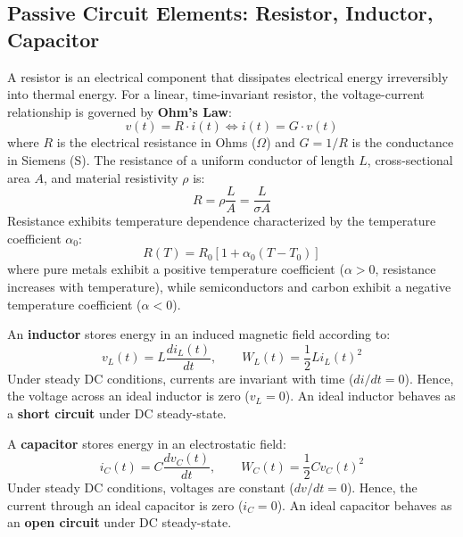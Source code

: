 \subsection{Passive Circuit Elements: Resistor, Inductor, Capacitor}

\begin{definition}
A resistor is an electrical component that dissipates electrical energy irreversibly into thermal energy. For a linear, time-invariant resistor, the voltage-current relationship is governed by \textbf{Ohm's Law}:
\begin{equation}
v(t) = R \cdot i(t) \iff i(t) = G \cdot v(t)
\end{equation}
where $R$ is the electrical resistance in Ohms ($\Omega$) and $G = 1/R$ is the conductance in Siemens (S). The resistance of a uniform conductor of length $L$, cross-sectional area $A$, and material resistivity $\rho$ is:
\begin{equation}
R = \rho \frac{L}{A} = \frac{L}{\sigma A}
\end{equation}
Resistance exhibits temperature dependence characterized by the temperature coefficient $\alpha_0$:
\begin{equation}
R(T) = R_0 \left[ 1 + \alpha_0 (T - T_0) \right]
\end{equation}
where pure metals exhibit a positive temperature coefficient ($\alpha > 0$, resistance increases with temperature), while semiconductors and carbon exhibit a negative temperature coefficient ($\alpha < 0$).
\end{definition}

\begin{definition}
An \textbf{inductor} stores energy in an induced magnetic field according to:
\begin{equation}
v_L(t) = L \frac{di_L(t)}{dt}, \qquad W_L(t) = \frac{1}{2} L i_L(t)^2
\end{equation}
Under steady DC conditions, currents are invariant with time ($di/dt = 0$). Hence, the voltage across an ideal inductor is zero ($v_L = 0$). An ideal inductor behaves as a \textbf{short circuit} under DC steady-state.

A \textbf{capacitor} stores energy in an electrostatic field:
\begin{equation}
i_C(t) = C \frac{dv_C(t)}{dt}, \qquad W_C(t) = \frac{1}{2} C v_C(t)^2
\end{equation}
Under steady DC conditions, voltages are constant ($dv/dt = 0$). Hence, the current through an ideal capacitor is zero ($i_C = 0$). An ideal capacitor behaves as an \textbf{open circuit} under DC steady-state.
\end{definition}

